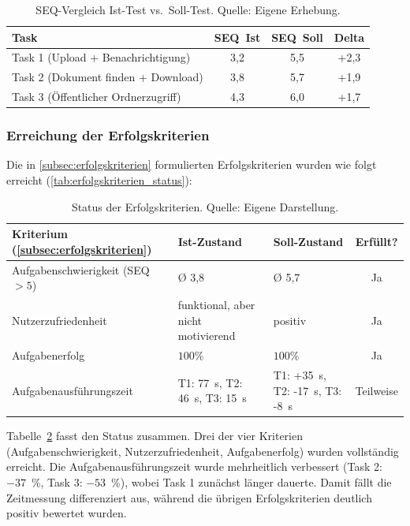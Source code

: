 \begin{table}[H]
  \centering
  \scriptsize
  \begin{tabular}{p{5.5cm}c c c}
    \toprule
    \textbf{Task} & \textbf{SEQ~Ist} & \textbf{SEQ~Soll} & \textbf{Delta} \\
    \midrule
    Task 1 (Upload + Benachrichtigung) & 3{,}2 & 5{,}5 & +2{,}3 \\
    Task 2 (Dokument finden + Download) & 3{,}8 & 5{,}7 & +1{,}9 \\
    Task 3 (Öffentlicher Ordnerzugriff) & 4{,}3 & 6{,}0 & +1{,}7 \\
    \bottomrule
  \end{tabular}
  \caption[SEQ-Vergleich Ist vs. Soll]{SEQ-Vergleich Ist-Test vs.~Soll-Test. Quelle: Eigene Erhebung.}
  \label{tab:seq_uebersicht}
\end{table}

\vfill

\subsubsection{Erreichung der Erfolgskriterien}\label{sec:erreichung_erfolgskriterien}

Die in \autoref{subsec:erfolgskriterien} formulierten Erfolgskriterien wurden wie folgt erreicht (\autoref{tab:erfolgskriterien_status}):

\begin{table}[H]
  \centering
  \scriptsize
  \begin{tabular}{p{4.5cm}p{2.8cm}p{3.5cm}c}
    \toprule
    \textbf{Kriterium (\autoref{subsec:erfolgskriterien})} & \textbf{Ist-Zustand} & \textbf{Soll-Zustand} & \textbf{Erfüllt?} \\
    \midrule
    Aufgabenschwierigkeit (SEQ $> 5$) & Ø 3,8 & Ø 5,7 & Ja \\
    Nutzerzufriedenheit & funktional, aber nicht motivierend & positiv & Ja \\
    Aufgabenerfolg & $100\%$ & $100\%$ & Ja \\
    Aufgabenausführungszeit & T1: 77~s, T2: 46~s, T3: 15~s & T1: +35~s, T2: {-}17~s, T3: {-}8~s & Teilweise \\
    \bottomrule
  \end{tabular}
  \caption[Status der Erfolgskriterien]{Status der Erfolgskriterien. Quelle: Eigene Darstellung.}
  \label{tab:erfolgskriterien_status}
\end{table}

Tabelle~\ref{tab:erfolgskriterien_status} fasst den Status zusammen. Drei der vier Kriterien (Aufgabenschwierigkeit, Nutzerzufriedenheit, Aufgabenerfolg) wurden vollständig erreicht. Die Aufgabenausführungszeit wurde mehrheitlich verbessert (Task 2: $-37$~\%, Task 3: $-53$~\%), wobei Task 1 zunächst länger dauerte. Damit fällt die Zeitmessung differenziert aus, während die übrigen Erfolgskriterien deutlich positiv bewertet wurden.

